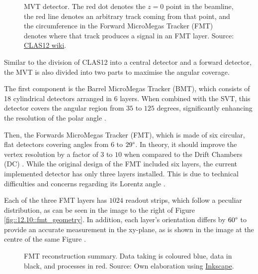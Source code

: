     \begin{figure}[b!]
        \centering{}
        \caption[MVT detector.]{MVT detector.
        The red dot denotes the $z=0$ point in the beamline, the red line denotes an arbitrary track coming from that point, and the circumference in the Forward MicroMegas Tracker (FMT) denotes where that track produces a signal in an FMT layer.
        Source: \hyperlink{jlab.org/physics/hall-b/clas12}{CLAS12 wiki}.}
        \label{fig::12.10::micromegas_vertex_tracker}
    \end{figure}

    Similar to the division of CLAS12 into a central detector and a forward detector, the MVT is also divided into two parts to maximise the angular coverage.

    The first component is the Barrel MicroMegas Tracker (BMT), which consists of 18 cylindrical detectors arranged in 6 layers.
    When combined with the SVT, this detector covers the angular region from $35$ to $125$ degrees, significantly enhancing the resolution of the polar angle \cite{acker2020mvt}.

    Then, the Forwards MicroMegas Tracker (FMT), which is made of six circular, flat detectors covering angles from $6$ to $29\degree$.
    In theory, it should improve the vertex resolution by a factor of $3$ to $10$ when compared to the Drift Chambers (DC) \cite{aune2009}.
    While the original design of the FMT included six layers, the current implemented detector has only three layers installed.
    This is due to technical difficulties and concerns regarding its Lorentz angle \cite{konczykowski2010}.

    Each of the three FMT layers has $1024$ readout strips, which follow a peculiar distribution, as can be seen in the image to the right of Figure \ref{fig::12.10::fmt_geometry}.
    In addition, each layer's orientation differs by $60\degree$ to provide an accurate measurement in the xy-plane, as is shown in the image at the centre of the same Figure \cite{acker2020mvt}.

    \begin{wrapfigure}{r}{0.50\textwidth}
        \centering{}
        \caption[FMT reconstruction summary]{FMT reconstruction summary.
        Data taking is coloured blue, data in black, and processes in red.
        Source: Own elaboration using \hyperlink{inkscape.org/}{Inkscape}.}
        \label{fig::12.11::fmt_reconstruction}
    \end{wrapfigure}

